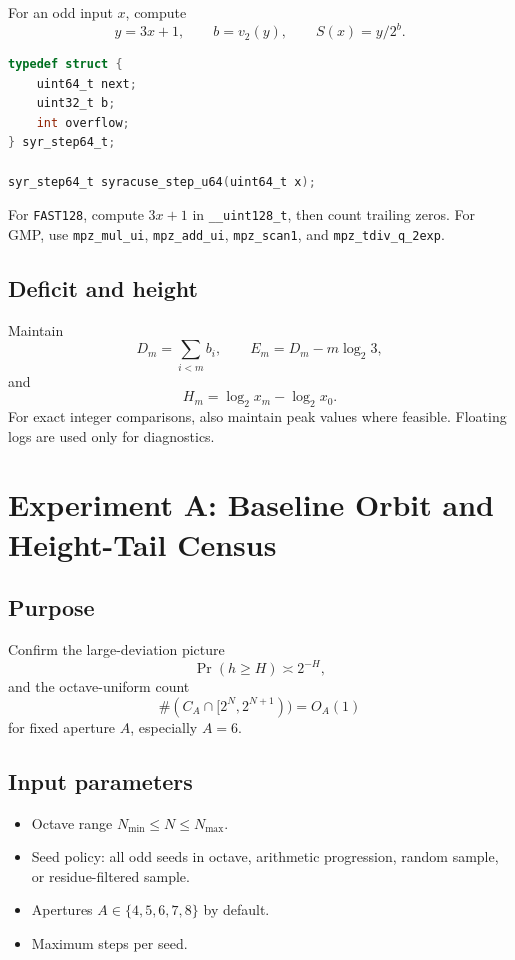 \documentclass[11pt]{article}
\newcommand{\vtwo}{v_2}
\begin{document}
For an odd input \(x\), compute
\[
        y=3x+1,
        \qquad b=\vtwo(y),
        \qquad S(x)=y/2^b.
\]

\begin{lstlisting}[language=C]
typedef struct {
    uint64_t next;
    uint32_t b;
    int overflow;
} syr_step64_t;

syr_step64_t syracuse_step_u64(uint64_t x);
\end{lstlisting}

For \texttt{FAST128}, compute \(3x+1\) in \texttt{\_\_uint128\_t}, then count trailing zeros.  For GMP, use \texttt{mpz\_mul\_ui}, \texttt{mpz\_add\_ui}, \texttt{mpz\_scan1}, and \texttt{mpz\_tdiv\_q\_2exp}.

\subsection{Deficit and height}

Maintain
\[
        D_m=\sum_{i<m}b_i,
        \qquad
        E_m=D_m-m\log_2 3,
\]
and
\[
        H_m=\log_2 x_m-\log_2 x_0.
\]
For exact integer comparisons, also maintain peak values where feasible.  Floating logs are used only for diagnostics.

\section{Experiment A: Baseline Orbit and Height-Tail Census}

\subsection{Purpose}

Confirm the large-deviation picture
\[
        \Pr(h\ge H)\asymp 2^{-H},
\]
and the octave-uniform count
\[
        \#(C_A\cap[2^N,2^{N+1}))=O_A(1)
\]
for fixed aperture \(A\), especially \(A=6\).

\subsection{Input parameters}

\begin{itemize}
\item Octave range \(N_{\min}\le N\le N_{\max}\).
\item Seed policy: all odd seeds in octave, arithmetic progression, random sample, or residue-filtered sample.
\item Apertures \(A\in\{4,5,6,7,8\}\) by default.
\item Maximum steps per seed.
\end{itemize}
\end{document}
